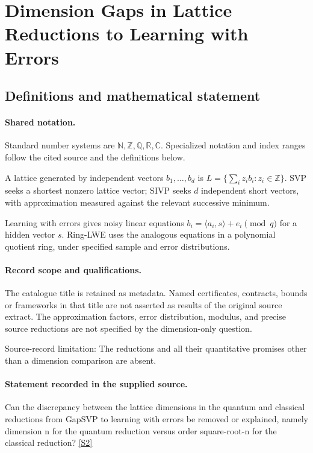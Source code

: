 \documentclass[11pt]{article}
\newcommand{\sref}[2]{\hyperlink{source:#1:#2}{[S#2]}}
\begin{document}
\section{Dimension Gaps in Lattice Reductions to Learning with Errors}\label{statement}

\subsection{Definitions and mathematical statement}

\paragraph{Shared notation.}Standard number systems are $\mathbb N,\mathbb Z,\mathbb Q,\mathbb R,\mathbb C$. Specialized notation and index ranges follow the cited source and the definitions below.


A lattice generated by independent vectors $b_1,\ldots,b_d$ is $L=\{\sum_i z_i b_i:z_i\in\mathbb Z\}$. SVP seeks a shortest nonzero lattice vector; SIVP seeks $d$ independent short vectors, with approximation measured against the relevant successive minimum.

Learning with errors gives noisy linear equations $b_i=\langle a_i,s\rangle+e_i\pmod q$ for a hidden vector $s$. Ring-LWE uses the analogous equations in a polynomial quotient ring, under specified sample and error distributions.
\paragraph{Record scope and qualifications.}
The catalogue title is retained as metadata. Named certificates, contracts, bounds or frameworks in that title are not asserted as results of the original source extract.
The approximation factors, error distribution, modulus, and precise source reductions are not specified by the dimension-only question.

Source-record limitation: The reductions and all their quantitative promises other than a dimension comparison are absent.
\paragraph{Statement recorded in the supplied source.}
Can the discrepancy between the lattice dimensions in the quantum and classical reductions from GapSVP to learning with errors be removed or explained, namely dimension n for the quantum reduction versus order square-root-n for the classical reduction? \sref{statement}{2}
\end{document}
